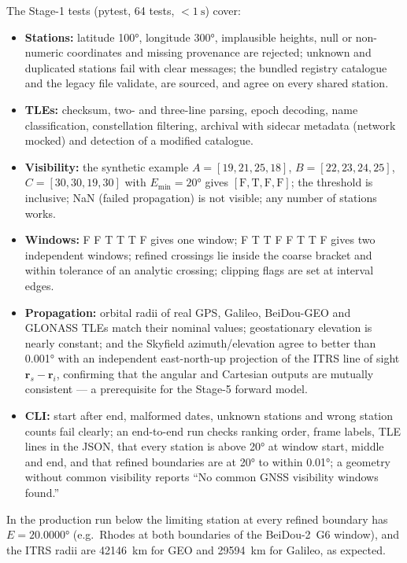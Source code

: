 \documentclass[11pt,a4paper]{article}
\newcommand{\code}[1]{{\ttfamily\def\_{\textunderscore\allowbreak}#1}}
\newcommand{\vect}[1]{\mathbf{#1}}
\begin{document}
The Stage-1 tests (\code{pytest}, 64 tests, $<\SI{1}{\second}$) cover:
\begin{itemize}
\item \textbf{Stations:} latitude \ang{100}, longitude \ang{300}, implausible
heights, \code{null} or non-numeric coordinates and missing provenance are
rejected; unknown and duplicated stations fail with clear messages; the
bundled registry catalogue and the legacy file validate, are sourced, and
agree on every shared station.
\item \textbf{TLEs:} checksum, two- and three-line parsing, epoch decoding,
name classification, constellation filtering, archival with sidecar
metadata (network mocked) and detection of a modified catalogue.
\item \textbf{Visibility:} the synthetic example
$A=[19,21,25,18]$, $B=[22,23,24,25]$, $C=[30,30,19,30]$ with $E_{\min}=\ang{20}$
gives $[\text{F},\text{T},\text{F},\text{F}]$; the threshold is inclusive;
NaN (failed propagation) is not visible; any number of stations works.
\item \textbf{Windows:} \code{F F T T T F} gives one window;
\code{F T T F F T T F} gives two independent windows; refined crossings lie
inside the coarse bracket and within tolerance of an analytic crossing;
clipping flags are set at interval edges.
\item \textbf{Propagation:} orbital radii of real GPS, Galileo, BeiDou-GEO and
GLONASS TLEs match their nominal values; geostationary elevation is nearly
constant; and the Skyfield azimuth/elevation agree to better than
\ang{0.001} with an independent east-north-up projection of the ITRS line of
sight $\vect r_s-\vect r_i$, confirming that the angular and Cartesian outputs
are mutually consistent --- a prerequisite for the Stage-5 forward model.
\item \textbf{CLI:} start after end, malformed dates, unknown stations and
wrong station counts fail clearly; an end-to-end run checks ranking order,
frame labels, TLE lines in the JSON, that every station is above
\ang{20} at window start, middle and end, and that refined boundaries are at
\ang{20} to within \ang{0.01}; a geometry without common visibility reports
``No common GNSS visibility windows found.''
\end{itemize}
In the production run below the limiting station at every refined boundary
has $E=\ang{20.0000}$ (e.g.\ Rhodes at both boundaries of the BeiDou-2~G6
window), and the ITRS radii are \SI{42146}{\kilo\metre} for GEO and
\SI{29594}{\kilo\metre} for Galileo, as expected.
\end{document}
